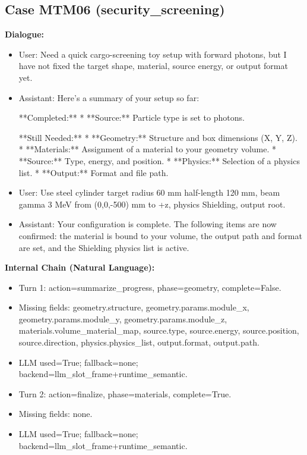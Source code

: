 \documentclass[11pt]{ctexart}
\begin{document}
\subsection{Case MTM06 (security\_screening)}
\textbf{Dialogue:}
\begin{itemize}
\item User: Need a quick cargo-screening toy setup with forward photons, but I have not fixed the target shape, material, source energy, or output format yet.
\item Assistant: Here's a summary of your setup so far:

**Completed:**
*   **Source:** Particle type is set to photons.

**Still Needed:**
*   **Geometry:** Structure and box dimensions (X, Y, Z).
*   **Materials:** Assignment of a material to your geometry volume.
*   **Source:** Type, energy, and position.
*   **Physics:** Selection of a physics list.
*   **Output:** Format and file path.
\item User: Use steel cylinder target radius 60 mm half-length 120 mm, beam gamma 3 MeV from (0,0,-500) mm to +z, physics Shielding, output root.
\item Assistant: Your configuration is complete. The following items are now confirmed: the material is bound to your volume, the output path and format are set, and the Shielding physics list is active.
\end{itemize}
\textbf{Internal Chain (Natural Language):}
\begin{itemize}
\item Turn 1: action=summarize\_progress, phase=geometry, complete=False.
\item Missing fields: geometry.structure, geometry.params.module\_x, geometry.params.module\_y, geometry.params.module\_z, materials.volume\_material\_map, source.type, source.energy, source.position, source.direction, physics.physics\_list, output.format, output.path.
\item LLM used=True; fallback=none; backend=llm\_slot\_frame+runtime\_semantic.
\item Turn 2: action=finalize, phase=materials, complete=True.
\item Missing fields: none.
\item LLM used=True; fallback=none; backend=llm\_slot\_frame+runtime\_semantic.
\end{itemize}
\end{document}
